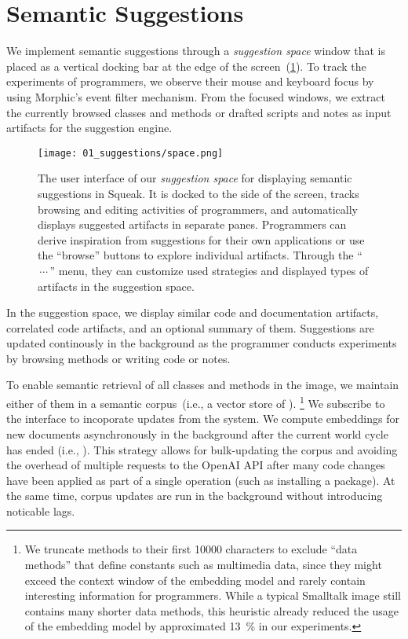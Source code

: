 
\section{Semantic Suggestions}
\label{sec:implementation/suggestions}

We implement semantic suggestions through a \emph{suggestion space} window that is placed as a vertical docking bar at the edge of the screen~(\cref{fig:implementation/suggestions/space}).
To track the experiments of programmers, we observe their mouse and keyboard focus by using Morphic's event filter mechanism.
From the focused windows, we extract the currently browsed classes and methods or drafted scripts and notes as input artifacts for the suggestion engine.

\begin{figure}
	\centering
	\texttt{[image: 01\_suggestions/space.png]} %
	\caption[The user interface of our \emph{suggestion space} for displaying semantic suggestions in Squeak.]{
		The user interface of our \emph{suggestion space} for displaying semantic suggestions in Squeak.
		It is docked to the side of the screen, tracks browsing and editing activities of programmers, and automatically displays suggested artifacts in separate panes.
		Programmers can derive inspiration from suggestions for their own applications or use the ``browse'' buttons to explore individual artifacts.
		Through the ``$\,{\cdots}\,$'' menu, they can customize used strategies and displayed types of artifacts in the suggestion space.
	}
	\label{fig:implementation/suggestions/space}
\end{figure}

In the suggestion space, we display similar code and documentation artifacts, correlated code artifacts, and an optional summary of them.
Suggestions are updated continously in the background as the programmer conducts experiments by browsing methods or writing code or notes.

To enable semantic retrieval of all classes and methods in the image, we maintain either of them in a semantic corpus~(i.e., a vector store of \semtex).
\footnote{We truncate methods to their first \num{10000} characters to exclude ``data methods'' that define constants such as multimedia data, since they might exceed the context window of the embedding model and rarely contain interesting information for programmers. While a typical Smalltalk image still contains many shorter data methods, this heuristic already reduced the usage of the embedding model by approximated \qty{13}{\percent} in our experiments.}
We subscribe to the  interface to incoporate updates from the system.
We compute embeddings for new documents asynchronously in the background after the current world cycle has ended (i.e., ).
This strategy allows for bulk-updating the corpus and avoiding the overhead of multiple requests to the OpenAI API after many code changes have been applied as part of a single operation (such as installing a package).
At the same time, corpus updates are run in the background without introducing noticable lags.
